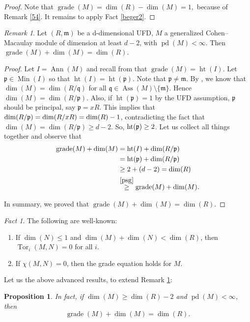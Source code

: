 \documentclass[11.05pt,a4paper]{amsart}
\newtheorem{proposition}[theorem]{Proposition}
\theoremstyle{definition}
\theoremstyle{remark}
\newtheorem{remark}[theorem]{Remark}\newtheorem{fact}[theorem]{Fact}
\newcommand{\Ass}{\operatorname{Ass}}
\newcommand{\grade}{\operatorname{grade}}
\newcommand{\Min}{\operatorname{Min}}
\newcommand{\Ht}{\operatorname{ht}}
\newcommand{\pd}{\operatorname{pd}}
\newcommand{\Tor}{\operatorname{Tor}}
\newcommand{\Ann}{\operatorname{Ann}}
\newcommand{\fp}{\frak{p}}
\begin{document}
\begin{proof}Note that
	$\grade(M)=\dim(R)-\dim(M)=1,$ because of
 Remark \ref{54}. It remains to apply  Fact \ref{beger2}.
\end{proof}




\begin{remark}\label{80}
	Let $(R,\mathfrak{m})$ be a d-dimensional UFD, $M$ a generalized Cohen–Macaulay module of dimension at least $d-2$, with $\pd(M) < \infty$. Then
$
	\grade(M) + \dim (M) = \dim( R). $
\end{remark}

\begin{proof}
	Let $I = \Ann(M)$ and recall from
	\cite{Beder} that 
		$\grade(M)=\operatorname{ht}(I)$.
Let $\mathfrak{p} \in \Min(I)$ so that $\operatorname{ht}(I) = \operatorname{ht}(\mathfrak{p})$. Note that $\mathfrak{p} \neq \mathfrak{m}$.
 By \cite[Exercise 9.5.7]{BSh}, we know that $\dim( M) = \dim (R/\mathfrak{q})$ for all $\mathfrak{q} \in \Ass(M) \setminus \{\mathfrak{m}\}$. Hence $\dim (M) = \dim (R/\mathfrak{p})$.
	Also, if $\Ht(\mathfrak{p})=1$ by the UFD assumption, $\mathfrak{p}$ should be principal, say $\mathfrak{p}=xR$. This implies that $\dim(R/\fp)=\dim(R/xR)=\dim (R)-1$, contradicting the fact that $\dim (M) = \dim( R/\mathfrak{p}) \geq d-2$. So, $\Ht(\fp)\geq 2$.
	Let us collect all things together and observe that\begin{align*}	\grade(M) + \dim (M)
	&= \operatorname{ht}( {I})+\dim(R/\mathfrak{p}) \\
	&=\operatorname{ht}(\mathfrak{p})+\dim(R/\mathfrak{p}) \\
	 &\geq 2+ (d-2)
	=\dim(R) \\
	&\stackrel{\ref{psg}}\geq\grade(M) + \dim (M).
	\end{align*}
 
In summary, we proved that $\grade(M) + \dim (M) = \dim (R).$	
\end{proof}


\begin{fact}\label{khi}
The following are well-known:
\begin{enumerate}
	\item If $\dim (N) \leq 1$ and $\dim (M) + \dim (N) < \dim (R)$, then $\Tor_i(M,N) = 0$ for all $i$.
	\item If $\chi(M,N) = 0$, then the grade equation holds for $M$.
\end{enumerate}\end{fact}
 Let us the above advanced results, to extend {Remark} \ref{80}: 
\begin{proposition}
	In fact, if $\dim (M) \geq \dim (R) - 2$ and $\pd(M) < \infty$, then
	\[
	\grade(M) + \dim( M) = \dim (R). \tag{*}
	\]
\end{proposition}
\end{document}
